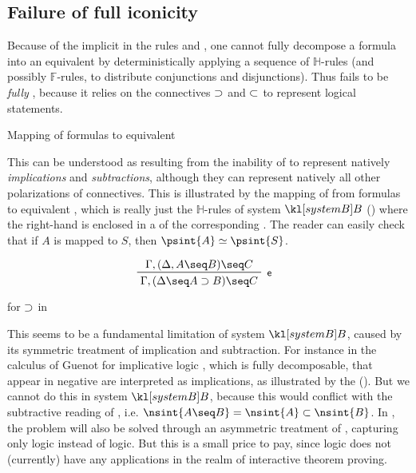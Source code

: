 \subsection{Failure of full iconicity}

Because of the implicit  in the rules \rsf{{\limp}{-}} and
\rsf{{\lsub}{+}}, one cannot fully decompose a formula into an equivalent
 by deterministically applying a sequence of $\mathbb{H}$-rules (and
possibly $\mathbb{F}$-rules, to distribute  conjunctions and 
disjunctions). Thus  fails to be \emph{fully }, because it
relies on the \emph{} connectives $\supset$ and $\subset$ to represent
logical statements.

\begin{marginfigure}
  
  \caption{Mapping of formulas to equivalent }
\end{marginfigure}

This can be understood as resulting from the inability of  to represent
natively \emph{ implications} and \emph{ subtractions}, although
they can represent natively all other polarizations of connectives. This is
illustrated by the mapping of  from  formulas to
equivalent , which is really just the $\mathbb{H}$-rules of system
$\sysB$ () where the right-hand  is enclosed in a
 of the corresponding . The reader can easily check that if $A$ is
mapped to $S$, then $\psint{A} \semequiv \psint{S}$.

\begin{marginfigure}
  $$
  \R[\rsf{e}]
    {\Gamma, (\Delta, A \seq B) \seq C}
    {\Gamma, (\Delta \seq A \limp B) \seq C}
  $$
  \caption{ for $\supset$ in }
\end{marginfigure}

This seems to be a fundamental limitation of system $\sysB$, caused by its
symmetric treatment of implication and subtraction. For instance in the  calculus  of Guenot for implicative logic \cite[Chapter
3]{guenot_nested_2013}, which is fully decomposable,  that appear
in negative  are interpreted as implications, as illustrated by the
  (). But we cannot do this
in system $\sysB$, because this would conflict with the subtractive reading of
 , i.e. $\nsint{A \seq B} = \nsint{A} \lsub \nsint{B}$. In
, the problem will also be solved through an asymmetric treatment
of , capturing only  logic instead of
 logic. But this is a small price to pay, since
 logic does not (currently) have any applications in the
realm of interactive theorem proving.